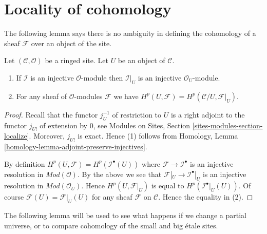








\section{Locality of cohomology}
\label{section-locality}

\noindent
The following lemma says there is no ambiguity in defining the cohomology
of a sheaf $\mathcal{F}$ over an object of the site.

\begin{lemma}
\label{lemma-cohomology-of-open}
Let $(\mathcal{C}, \mathcal{O})$ be a ringed site.
Let $U$ be an object of $\mathcal{C}$.
\begin{enumerate}
\item If $\mathcal{I}$ is an injective $\mathcal{O}$-module
then $\mathcal{I}|_U$ is an injective $\mathcal{O}_U$-module.
\item For any sheaf of $\mathcal{O}$-modules $\mathcal{F}$ we have
$H^p(U, \mathcal{F}) = H^p(\mathcal{C}/U, \mathcal{F}|_U)$.
\end{enumerate}
\end{lemma}

\begin{proof}
Recall that the functor $j_U^{-1}$ of restriction to $U$ is a right adjoint
to the functor $j_{U!}$ of extension by $0$, see
Modules on Sites, Section
\ref{sites-modules-section-localize}.
Moreover, $j_{U!}$ is exact. Hence (1) follows from
Homology, Lemma \ref{homology-lemma-adjoint-preserve-injectives}.

\medskip\noindent
By definition $H^p(U, \mathcal{F}) = H^p(\mathcal{I}^\bullet(U))$
where $\mathcal{F} \to \mathcal{I}^\bullet$ is an injective resolution
in $\textit{Mod}(\mathcal{O})$.
By the above we see that $\mathcal{F}|_U \to \mathcal{I}^\bullet|_U$
is an injective resolution in $\textit{Mod}(\mathcal{O}_U)$.
Hence $H^p(U, \mathcal{F}|_U)$ is equal to
$H^p(\mathcal{I}^\bullet|_U(U))$.
Of course $\mathcal{F}(U) = \mathcal{F}|_U(U)$ for
any sheaf $\mathcal{F}$ on $\mathcal{C}$.
Hence the equality in (2).
\end{proof}

\noindent
The following lemma will be used to see what happens if we change a
partial universe, or to compare cohomology of the small and big \'etale
sites.

